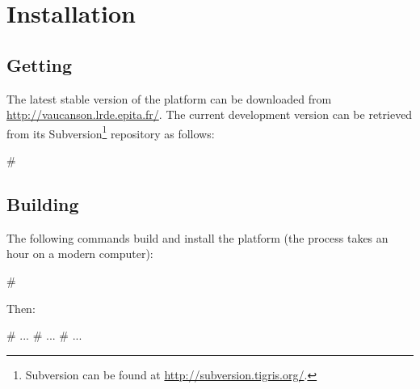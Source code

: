 \chapter{Installation}

\section{Getting \Vauc}

The latest stable version of the \Vauc platform can be downloaded
from \url{http://vaucanson.lrde.epita.fr/}.  The current development
version can be retrieved from its Subversion\footnote{%
  Subversion can be found at \url{http://subversion.tigris.org/}.
} repository as follows:

\begin{shell}
# 
\end{shell}

\section{Building \Vauc}

The following commands build and install the platform (the process
takes an hour on a modern computer):
\begin{shell}
# 
\end{shell}
Then:
\begin{shell}
# 
...
# 
...
# 
...
\end{shell}


